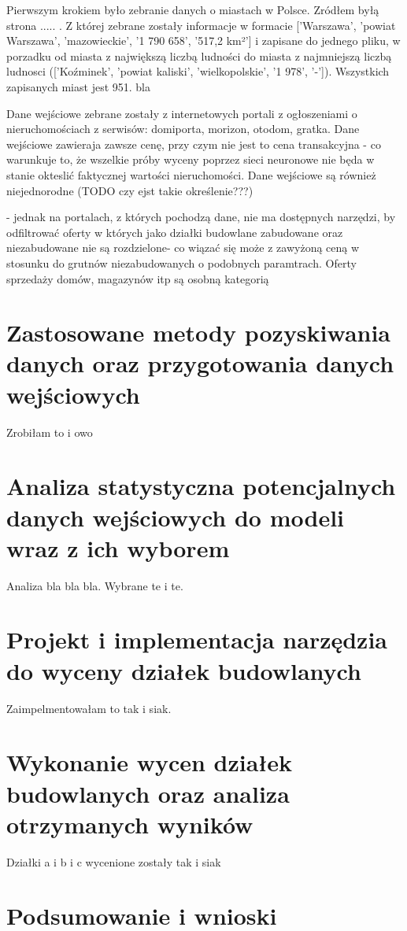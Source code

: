 \documentclass[a4paper,12pt,twoside,openany]{report}
\begin{document}
Pierwszym krokiem było zebranie danych o miastach w Polsce.
Zródłem byłą strona ..... . Z której zebrane zostały informacje w formacie ['Warszawa', 'powiat Warszawa', 'mazowieckie', '1 790 658', '517,2 km²']
i zapisane do jednego pliku, w porzadku od miasta z największą liczbą ludności do miasta z najmniejszą liczbą ludnosci (['Koźminek', 'powiat kaliski', 'wielkopolskie', '1 978', '-']).
Wszystkich zapisanych miast jest 951.
bla


Dane wejściowe zebrane zostały  z internetowych portali z ogłoszeniami o nieruchomościach z serwisów: domiporta, morizon, otodom, gratka.
Dane wejściowe zawieraja zawsze cenę, przy czym nie jest to cena transakcyjna - co warunkuje to, że wszelkie próby wyceny poprzez sieci neuronowe nie będa w stanie okteslić faktycznej wartości nieruchomości.
Dane wejściowe są również niejednorodne (TODO czy ejst takie określenie???)


- jednak na portalach, z których pochodzą dane, nie ma dostępnych narzędzi, by odfiltrować oferty w których jako działki budowlane zabudowane oraz niezabudowane nie są rozdzielone- co wiązać się może z zawyżoną ceną w stosunku do grutnów niezabudowanych o podobnych paramtrach.
Oferty sprzedaży domów, magazynów itp są osobną kategorią


\chapter{Zastosowane metody pozyskiwania danych oraz przygotowania danych wejściowych}
Zrobiłam to i owo
\chapter{Analiza statystyczna potencjalnych danych wejściowych do modeli wraz z ich wyborem}
Analiza bla bla bla.
Wybrane te i te.
\chapter{Projekt i implementacja narzędzia do wyceny działek budowlanych}
Zaimpelmentowałam to tak i siak.
\chapter{Wykonanie wycen działek budowlanych oraz analiza otrzymanych wyników}
Działki a i b i c wycenione zostały tak i siak
\chapter{Podsumowanie i wnioski}
\end{document}
